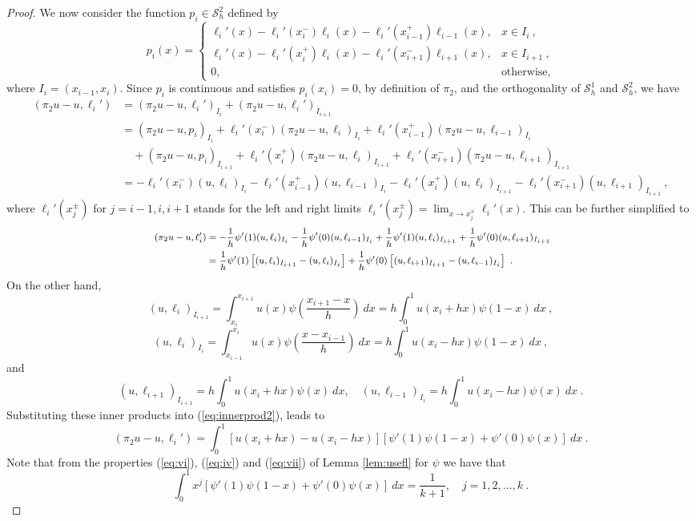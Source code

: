\documentclass{amsart}
\begin{document}
\begin{proof}
We now consider the function $p_i\in\mathcal{S}_h^2$ defined by
$$p_i(x)=\left\{\begin{array}{ll}
\ell_i'(x)-\ell_i'(x_i^-)\ell_i(x)-\ell_i'(x_{i-1}^+)\ell_{i-1}(x), & x\in I_i\ ,\\
\ell_i'(x)-\ell_i'(x_i^+)\ell_i(x)-\ell_i'(x_{i+1}^-)\ell_{i+1}(x), & x\in I_{i+1}\ ,\\
0, & \text{otherwise},
\end{array}
\right. $$
where $I_i=(x_{i-1},x_i)$.
Since $p_i$ is continuous and satisfies $p_i(x_i)=0$, by definition of $\pi_2$, and the orthogonality of $\mathcal{S}_h^1$ and $\mathcal{S}_h^2$, we have
$$
\begin{aligned}
(\pi_2u-u,\ell_i')&= (\pi_2u-u,\ell_i')_{I_i}+(\pi_2u-u,\ell_i')_{I_{i+1}}\\
&= (\pi_2u-u,p_i)_{I_i}+\ell_i'(x_i^-)(\pi_2u-u,\ell_i)_{I_{i}}+\ell_i'(x_{i-1}^+)(\pi_2u-u,\ell_{i-1})_{I_i}\\
&\quad +(\pi_2u-u,p_i)_{I_{i+1}}+\ell_i'(x_i^+)(\pi_2u-u,\ell_i)_{I_{i+1}}+\ell_i'(x_{i+1}^-)(\pi_2u-u,\ell_{i+1})_{I_{i+1}}\\
&=-\ell_i'(x_i^-)(u,\ell_i)_{I_i}-\ell_i'(x_{i-1}^+)(u,\ell_{i-1})_{I_i}-\ell_i'(x_i^+)(u,\ell_i)_{I_{i+1}}-\ell_i'(x_{i+1}^-)(u,\ell_{i+1})_{I_{i+1}}\ , 
\end{aligned} 
$$
%
where $\ell_i'(x_j^{\pm})$ for $j=i-1,i,i+1$ stands for the left and right limits $\ell_i'(x_j^{\pm}
)=\lim_{x\to x_j^{\pm}}\ell_i'(x)$.
%
This can be further simplified to
\begin{equation}\label{eq:innerprod2}
\text{ \footnotesize 
$\begin{aligned}
(\pi_2u-u,\ell_i')&=   -\frac{1}{h}\psi'(1)(u,\ell_i)_{I_i}-\frac{1}{h}\psi'(0)(u,\ell_{i-1})_{I_i}+\frac{1}{h}\psi'(1)(u,\ell_i)_{I_{i+1}}+\frac{1}{h}\psi'(0)(u,\ell_{i+1})_{I_{i+1}}\\
&= \frac{1}{h}\psi'(1)\left[(u,\ell_i)_{I_{i+1}}-(u,\ell_i)_{I_i}\right]+\frac{1}{h}\psi'(0)\left[(u,\ell_{i+1})_{I_{i+1}}-(u,\ell_{i-1})_{I_i}\right]\ .
\end{aligned}$} 
\end{equation}
On the other hand,
$$(u,\ell_i)_{I_{i+1}}=\int_{x_i}^{x_{i+1}}u(x)\psi\left(\frac{x_{i+1}-x}{h} \right)~dx=h\int_0^1 u(x_i+hx)\psi(1-x)~dx\ ,$$
$$(u,\ell_i)_{I_i}=\int_{x_{i-1}}^{x_i}u(x)\psi\left(\frac{x-x_{i-1}}{h} \right)~dx=h\int_0^1 u(x_i-hx)\psi(1-x)~dx\ ,$$
and
$$(u,\ell_{i+1})_{I_{i+1}}=h\int_0^1 u(x_i+hx)\psi(x)~dx,\quad (u,\ell_{i-1})_{I_i}=h\int_0^1 u(x_i-hx)\psi(x)~dx\ .$$
Substituting these inner products into (\ref{eq:innerprod2}), leads to
\begin{equation}\label{eq:innerprod3}
(\pi_2u-u,\ell_i')=\int_0^1 \left[u(x_i+hx)-u(x_i-hx) \right]\left[\psi'(1)\psi(1-x)+\psi'(0)\psi(x) \right]~dx\ .
\end{equation}
Note that from the properties (\ref{eq:vi}), (\ref{eq:iv}) and (\ref{eq:vii}) of Lemma \ref{lem:usefl} for $\psi$ we have that
$$\int_0^1 x^j\left[\psi'(1)\psi(1-x)+\psi'(0)\psi(x)\right]~dx=\frac{1}{k+1},\quad j=1,2,\dots,k\ .$$


\end{proof}
\end{document}
